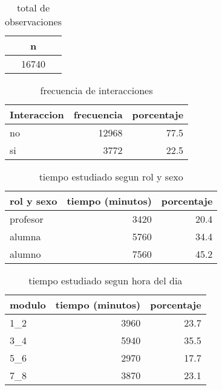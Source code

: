 \documentclass[spanish]{article}
\begin{document}
\begin{table}[h!]
\begin{center}
\begin{tabular}{|c|}
\hline
n    \\ \hline
16740\\ \hline
\end{tabular}
\caption{total de observaciones}
\end{center}
\end{table}

\begin{table}[h!]
\begin{center}
\begin{tabular}{|l|r|r|}
\hline
Interaccion & frecuencia & porcentaje   \\ \hline
no          &      12968 &          77.5\\ \hline
si          &       3772 &          22.5\\ \hline
\end{tabular}
\caption{frecuencia de interacciones}
\end{center}
\end{table}

\begin{table}[h!]
\begin{center}
\begin{tabular}{|l|r|r|}
\hline
rol y sexo & tiempo (minutos) & porcentaje   \\ \hline
profesor   &             3420 &          20.4\\ \hline
alumna     &             5760 &          34.4\\ \hline
alumno     &             7560 &          45.2\\ \hline
\end{tabular}
\caption{tiempo estudiado segun rol y sexo}
\end{center}
\end{table}

\begin{table}[h!]
\begin{center}
\begin{tabular}{|l|r|r|}
\hline
modulo & tiempo (minutos) & porcentaje   \\ \hline
1\_2    &             3960 &          23.7\\ \hline
3\_4    &             5940 &          35.5\\ \hline
5\_6    &             2970 &          17.7\\ \hline
7\_8    &             3870 &          23.1\\ \hline
\end{tabular}
\caption{tiempo estudiado segun hora del dia}
\end{center}
\end{table}
\end{document}
